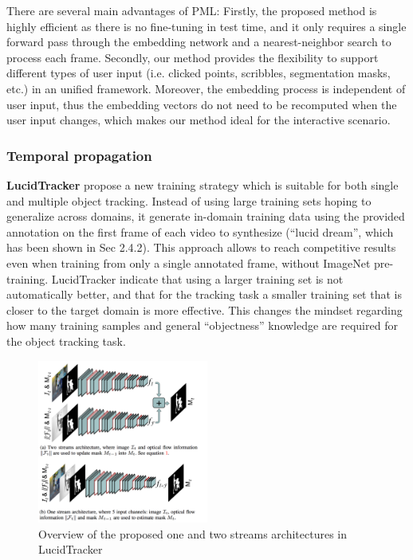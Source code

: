 There are several main advantages of PML: Firstly, the proposed method is highly efficient as there is no fine-tuning in test time, and it only requires a single forward pass through the embedding network and a nearest-neighbor search to process each frame. Secondly, our method provides the ﬂexibility to support different types of user input (i.e. clicked points, scribbles, segmentation masks, etc.) in an unified framework. Moreover, the embedding process is independent of user input, thus the embedding vectors do not need to be recomputed when the user input changes, which makes our method ideal for the interactive scenario.

\subsubsection{Temporal propagation}

\textbf{LucidTracker}\cite{LucidTracker} propose a new training strategy which is suitable for both single and multiple object tracking. Instead of using large training sets hoping to generalize across domains, it generate in-domain training data using the provided annotation on the first frame of each video to synthesize (``lucid dream'', which has been shown in Sec 2.4.2). This approach allows to reach competitive results even when training from only a single annotated frame, without ImageNet pre-training. LucidTracker indicate that using a larger training set is not automatically better, and that for the tracking task a smaller training set that is closer to the target domain is more effective. This changes the mindset regarding how many training samples and general ``objectness'' knowledge are required for the object tracking task.

\begin{figure}[ht]
    \centering
    \includegraphics[width=0.5\textwidth]{./figure/lucid_tracker.png}
    \caption{Overview of the proposed one and two streams architectures in LucidTracker}
    \label{lucid_tracker}
\end{figure}

